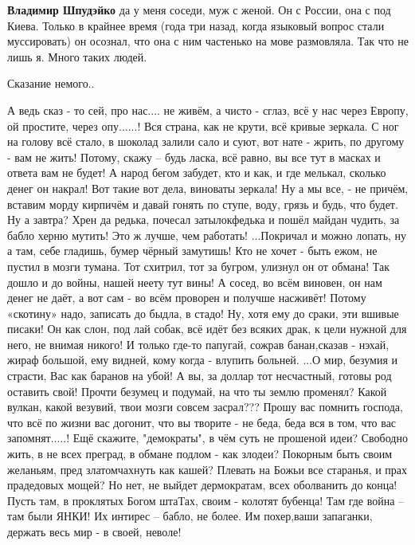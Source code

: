\begin{itemize}
\begin{itemize}
\textbf{Владимир Шпудэйко} да у меня соседи, муж с женой. Он с России, она с под Киева. Только в крайнее время (года три назад, когда языковый вопрос стали муссировать) он осознал, что она с ним частенько на мове размовляла.
Так что не лишь я. Много таких людей.
\end{itemize}

 

Сказание немого..

А ведь сказ - то сей, про нас.... не живём, а чисто - сглаз, всё у нас через
Европу, ой простите, через опу......! Вся страна, как не крути, всё кривые
зеркала. С ног на голову всё стало, в шоколад залили сало и суют, вот нате -
жрить, по другому - вам не жить! Потому, скажу – будь ласка, всё равно, вы все
тут в масках и ответа вам не будет! А народ бегом забудет, кто и как, и где
мелькал, сколько денег он накрал! Вот такие вот дела, виноваты зеркала! Ну а мы
все, - не причём, вставим морду кирпичём и давай гонять по ступе, воду, грязь и
будь, что будет. Ну а завтра? Хрен да редька, почесал затылокфедька и пошёл
майдан чудить, за бабло херню мутить! Это ж лучше, чем работать! ...Покричал и
можно лопать, ну а там, себе гладишь, бумер чёрный замутишь! Кто не хочет -
быть ежом, не пустил в мозги тумана. Тот схитрил, тот за бугром, улизнул он от
обмана! Так дошло и до войны, нашей неету тут вины! А сосед, во всём виновен,
он нам денег не даёт, а вот сам - во всём проворен и получше насживёт! Потому
«скотину» надо, записать до быдла, в стадо! Ну, хотя ему до сраки, эти вшивые
писаки! Он как слон, под лай собак, всё идёт без всяких драк, к цели нужной для
него, не внимая никого! И только где-то папугай, сожрав банан,сказав - нэхай,
жираф большой, ему видней, кому когда - влупить больней. ...О мир, безумия и
страсти, Вас как баранов на убой! А вы, за доллар тот несчастный, готовы род
оставить свой! Прочти безумец и подумай, на что ты землю променял? Какой
вулкан, какой везувий, твои мозги совсем засрал??? Прошу вас помнить господа,
что всё по жизни вас догонит, что вы творите - не беда, беда вся в том, что вас
запомнят.....! Ещё скажите, "демократы", в чём суть не прошеной идеи? Свободно
жить, в не всех преград, в обмане подлом - как злодеи? Покорным быть своим
желаньям, пред златомчахнуть как кашей? Плевать на Божьи все старанья, и прах
прадедовых мощей? Но нет, не выйдет дермократам, всех оболванить до конца!
Пусть там, в проклятых Богом штаТах, своим - колотят бубенца! Там где война –
там были ЯНКИ! Их интирес – бабло, не более. Им похер,ваши запаганки, держать
весь мир - в своей, неволе!


\end{itemize}
